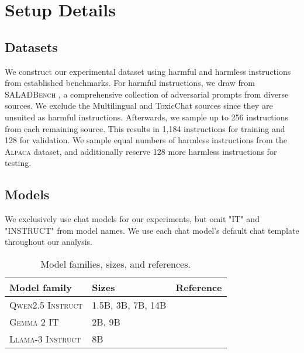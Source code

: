\section{Setup Details} \label{app:setup-details}
\subsection{Datasets}
\label{app:datasets}
We construct our experimental dataset using harmful and harmless instructions from established benchmarks. For harmful instructions, we draw from \textsc{SALADBench} \cite{li2024salad}, a comprehensive collection of adversarial prompts from diverse sources. We exclude the Multilingual \cite{wang2023all} and ToxicChat \cite{lin2023toxicchat} sources since they are unsuited as harmful instructions. Afterwards, we sample up to 256 instructions from each remaining source. This results in 1,184 instructions for training and 128 for validation. We sample equal numbers of harmless instructions from the \textsc{Alpaca} dataset, and additionally reserve 128 more harmless instructions for testing.

\subsection{Models}
We exclusively use chat models for our experiments, but omit "IT" and "INSTRUCT" from model names. We use each chat model's default chat template throughout our analysis.

\begin{table}[h]
\centering
\caption{Model families, sizes, and references.}
\label{tab:models}
\begin{tabular}{lll}
\toprule
\textbf{Model family} & \textbf{Sizes} & \textbf{Reference} \\
\midrule
\textsc{Qwen2.5 Instruct} & 1.5B, 3B, 7B, 14B & \citet{yang2024qwen2} \\
\textsc{Gemma 2 IT} & 2B, 9B  & \citet{team2024gemma} \\
\textsc{Llama-3 Instruct} & 8B & \citet{dubey2024llama} \\
\bottomrule
\end{tabular}
\end{table}




